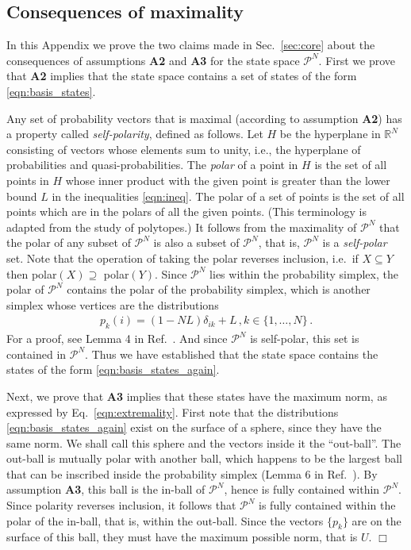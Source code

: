 \documentclass[%
 reprint,superscriptaddress,
 amsmath,amssymb,
 aps,pra, onecolumn, 12pt
]{revtex4-2}
\newcommand{\eqn}[1]{\begin{eqnarray} #1 \end{eqnarray}}
\newcommand{\tit}[1]{\textit{#1}}
\begin{document}
\begin{appendix}
\section{Consequences of maximality \label{app:vitality2}}
In this Appendix we prove the two claims made in Sec.\ \ref{sec:core} about the consequences of assumptions {\bf A2} and {\bf A3} for the state space $\mathcal{P}^{N}$. First we prove that {\bf A2} implies that the state space contains a set of states of the form \eqref{eqn:basis_states}.

Any set of probability vectors that is maximal (according to assumption {\bf A2}) has a property called \tit{self-polarity}, defined as follows. Let $H$ be the hyperplane in $\mathbb{R}^{N}$ consisting of vectors whose elements sum to unity, i.e., the hyperplane of probabilities and quasi-probabilities. The \tit{polar} of a point in $H$ is the set of all points in $H$ whose inner product with the given point is greater than the lower bound $L$ in the inequalities \eqref{eqn:ineq}. The polar of a set of points is the set of all points which are in the polars of all the given points. (This terminology is adapted from the study of polytopes.) It follows from the maximality of $\mathcal{P}^N$ that the polar of any subset of $\mathcal{P}^N$ is also a subset of $\mathcal{P}^N$, that is, $\mathcal{P}^N$ is a \tit{self-polar} set.
Note that the operation of taking the polar reverses inclusion, i.e.\ if $X \subseteq Y$ then polar$(X) \supseteq$ polar$(Y)$. Since $\mathcal{P}^{N}$ lies within the probability simplex, the polar of $\mathcal{P}^{N}$ contains the polar of the probability simplex, which is another simplex whose vertices are the distributions
\eqn{ \label{eqn:basis_states_again}
p_k(i) = (1-NL)\delta_{ik} + L \, , k \in \{1,\dots, N\} \, .
}
For a proof, see Lemma 4 in Ref.\ \cite{QPLEX}. And since $\mathcal{P}^{N}$ is self-polar, this set is contained in $\mathcal{P}^{N}$. Thus we have established that the state space contains the states of the form \eqref{eqn:basis_states_again}.

Next, we prove that {\bf A3} implies that these states have the maximum norm, as expressed by Eq.\  \eqref{eqn:extremality}. First note that the distributions \eqref{eqn:basis_states_again} exist on the surface of a sphere, since they have the same norm. We shall call this sphere and the vectors inside it the ``out-ball''. The out-ball is mutually polar with another ball, which happens to be the largest ball that can be inscribed inside the probability simplex (Lemma 6 in Ref.\ \cite{QPLEX}). By assumption {\bf A3}, this ball is the in-ball of $\mathcal{P}^{N}$, hence is fully contained within $\mathcal{P}^{N}$. Since polarity reverses inclusion, it follows that $\mathcal{P}^{N}$ is fully contained within the polar of the in-ball, that is, within the out-ball. Since the vectors $\{p_k \}$ are on the surface of this ball, they must have the maximum possible norm, that is $U$. $\Box$


\end{appendix}
\end{document}
